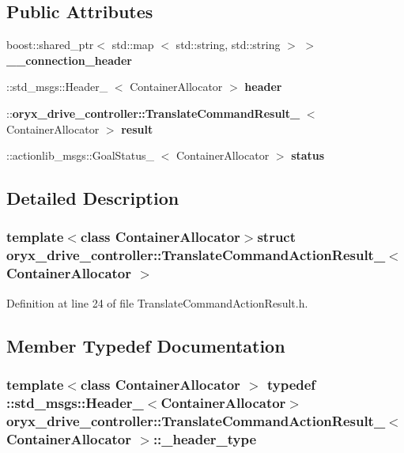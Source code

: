 \subsection*{\-Public \-Attributes}
\begin{DoxyCompactItemize}
\item 
boost\-::shared\-\_\-ptr$<$ std\-::map\*
$<$ std\-::string, std\-::string $>$ $>$ {\bf \-\_\-\-\_\-connection\-\_\-header}
\item 
\-::std\-\_\-msgs\-::\-Header\-\_\-\*
$<$ \-Container\-Allocator $>$ {\bf header}
\item 
\-::{\bf oryx\-\_\-drive\-\_\-controller\-::\-Translate\-Command\-Result\-\_\-}\*
$<$ \-Container\-Allocator $>$ {\bf result}
\item 
\-::actionlib\-\_\-msgs\-::\-Goal\-Status\-\_\-\*
$<$ \-Container\-Allocator $>$ {\bf status}
\end{DoxyCompactItemize}


\subsection{\-Detailed \-Description}
\subsubsection*{template$<$class Container\-Allocator$>$struct oryx\-\_\-drive\-\_\-controller\-::\-Translate\-Command\-Action\-Result\-\_\-$<$ Container\-Allocator $>$}



\-Definition at line 24 of file \-Translate\-Command\-Action\-Result.\-h.



\subsection{\-Member \-Typedef \-Documentation}
\subsubsection[{\-\_\-header\-\_\-type}]{\setlength{\rightskip}{0pt plus 5cm}template$<$class Container\-Allocator $>$ typedef \-::std\-\_\-msgs\-::\-Header\-\_\-$<$\-Container\-Allocator$>$ {\bf oryx\-\_\-drive\-\_\-controller\-::\-Translate\-Command\-Action\-Result\-\_\-}$<$ \-Container\-Allocator $>$\-::{\bf \-\_\-header\-\_\-type}}\label{structoryx__drive__controller_1_1TranslateCommandActionResult___a8e178fd471d6685bff4ec76808575357}



